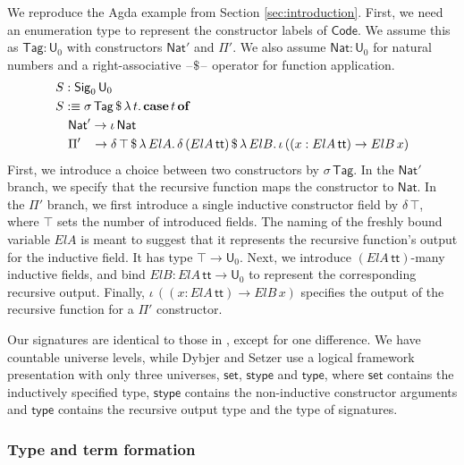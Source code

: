 \documentclass[acmsmall,screen,review,anonymous]{acmart}
\newcommand{\msf}[1]{{\mathsf{#1}}}
\newcommand{\mbf}[1]{{\mathbf{#1}}}
\newcommand{\U}{\msf{U}}
\newcommand{\Nat}{\msf{Nat}}
\newcommand{\Sig}{\msf{Sig}}
\newcommand{\Code}{\msf{Code}}
\newcommand{\Tag}{\msf{Tag}}
\newcommand{\case}{\mbf{case}}
\newcommand{\of}{\mbf{of}}
\newcommand{\ttt}{\msf{tt}}
\newcommand{\blank}{{\mathord{\hspace{1pt}\text{--}\hspace{1pt}}}}
\begin{document}
\begin{example}\label{ex:code-signature}
We reproduce the Agda example from Section \ref{sec:introduction}. First, we need an enumeration
type to represent the constructor labels of $\Code$. We assume this as $\Tag : \U_0$ with
constructors $\Nat'$ and $\Pi'$. We also assume $\Nat : \U_0$ for natural numbers and a
right-associative $\blank\!\$\!\blank$ operator for function application.
\begin{alignat*}{4}
  & S : \Sig_0\,\U_0\\
  & S :\equiv \sigma\,\Tag\,\$\,\lambda\,t.\,\case\,t\,\of \\
  & \quad \Nat' \to \iota\,\Nat \\
  & \quad \Pi'\hspace{0.85em} \to \delta\,\top\,\$\,\lambda\,{ElA}.\, \delta\,({ElA}\,\ttt)\,\$\,\lambda\,{ElB}.\,
      \iota\, ((x : {ElA}\,\ttt) \to {ElB}\,x)
\end{alignat*}
First, we introduce a choice between two constructors by $\sigma\,\Tag$. In the $\Nat'$ branch, we
specify that the recursive function maps the constructor to $\Nat$. In the $\Pi'$ branch, we first
introduce a single inductive constructor field by $\delta\,\top$, where $\top$ sets the number of
introduced fields. The naming of the freshly bound variable ${ElA}$ is meant to suggest that it
represents the recursive function's output for the inductive field. It has type $\top \to \U_0$.
Next, we introduce $({ElA}\,\ttt)$-many inductive fields, and bind ${ElB} : {ElA}\,\ttt \to \U_0$ to
represent the corresponding recursive output. Finally, $\iota\, ((x : {ElA}\,\ttt) \to {ElB}\,x)$
specifies the output of the recursive function for a $\Pi'$ constructor.
\end{example}

Our signatures are identical to those in \cite{DBLP:journals/apal/DybjerS03}, except for
one difference.  We have countable universe levels, while Dybjer and Setzer use a logical framework
presentation with only three universes, $\msf{set}$, $\msf{stype}$ and $\msf{type}$, where
$\msf{set}$ contains the inductively specified type, $\msf{stype}$ contains the non-inductive
constructor arguments and $\msf{type}$ contains the recursive output type and the type of
signatures.

\subsubsection{Type and term formation}\label{sec:ir-type-and-term-formation}
\end{document}
